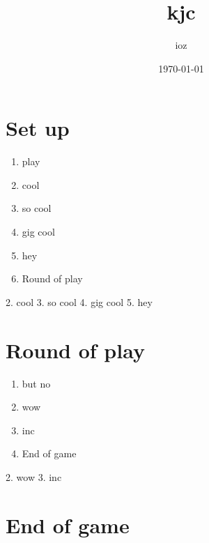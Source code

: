 \documentclass{article}%
\title{kjc}%
\author{ioz}%
\date{\today}%
\begin{document}
%
\pagestyle{empty}%
\normalsize%
\maketitle%
\section{ Set up
}%
\label{sec:Setup}%
\begin{enumerate}%
\item%
 play
%
\item%
 cool
%
\item%
 so cool
%
\item%
 gig cool
%
\item%
 hey
%
\item%
Round of play
%
\end{enumerate}%
2. cool
%
3. so cool
%
4. gig cool
%
5. hey


%
\section{ Round of play
}%
\label{sec:Roundofplay}%
\begin{enumerate}%
\item%
 but no
%
\item%
 wow
%
\item%
 inc
%
\item%
End of game%
\end{enumerate}%
2. wow
%
3. inc


%
\section{ End of game}%
\label{sec:Endofgame}%

%
\end{document}

